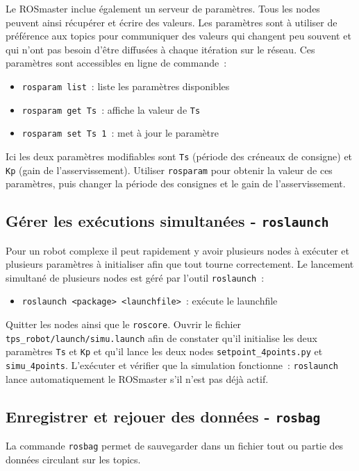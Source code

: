 \documentclass[12pt,a4paper]{article}
\begin{document}
Le ROSmaster inclue également un serveur de paramètres. Tous les nodes peuvent ainsi récupérer et écrire des valeurs. Les paramètres sont à utiliser de préférence aux topics pour communiquer des valeurs qui changent peu souvent et qui n'ont pas besoin d'être diffusées à chaque itération sur le réseau. Ces paramètres sont accessibles en ligne de commande~:
\begin{itemize}
\item \texttt{rosparam list}~: liste les paramètres disponibles
\item \texttt{rosparam get Ts}~: affiche la valeur de \texttt{Ts}
\item \texttt{rosparam set Ts 1}~: met à jour le paramètre
\end{itemize}
Ici les deux paramètres modifiables sont \texttt{Ts} (période des créneaux de consigne) et \texttt{Kp} (gain de l'asservissement).
Utiliser \texttt{rosparam} pour obtenir la valeur de ces paramètres, puis changer la période des consignes et le gain de l'asservissement.

\subsection{Gérer les exécutions simultanées - \texttt{roslaunch}}

Pour un robot complexe il peut rapidement y avoir plusieurs nodes à exécuter et plusieurs paramètres à initialiser afin que tout tourne correctement. Le lancement simultané de plusieurs nodes est géré par l'outil \texttt{roslaunch}~:
\begin{itemize}
\item \texttt{roslaunch <package> <launchfile>}~: exécute le launchfile
\end{itemize}
Quitter les nodes ainsi que le \texttt{roscore}.
Ouvrir le fichier \texttt{tps\_robot/launch/simu.launch} afin de constater qu'il initialise les deux paramètres \texttt{Ts} et \texttt{Kp} et qu'il lance les deux nodes \texttt{setpoint\_4points.py} et \texttt{simu\_4points}.
L'exécuter et vérifier que la simulation fonctionne~: \texttt{roslaunch} lance automatiquement le ROSmaster s'il n'est pas déjà actif.

\subsection{Enregistrer et rejouer des données - \texttt{rosbag}}

La commande \texttt{rosbag} permet de sauvegarder dans un fichier tout ou partie des données circulant sur les topics.
\pagebreak
\end{document}
